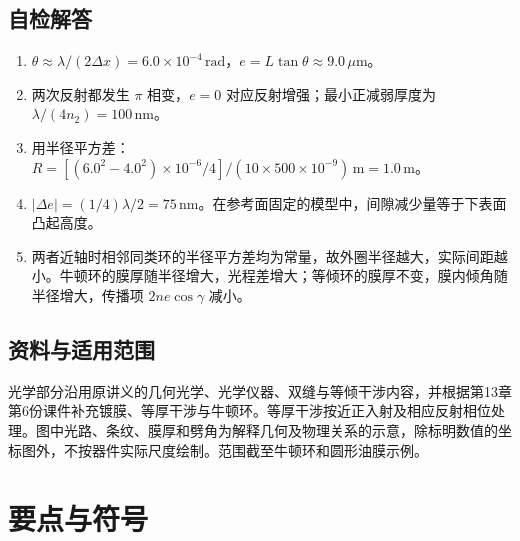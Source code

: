 \documentclass[UTF8,fontset=none,zihao=-4,a4paper]{ctexart}
\newcommand{\chapterpage}[1]{\clearpage\section{#1}}
\newcommand{\unit}[1]{\,\mathrm{#1}}
\begin{document}
\subsection{自检解答}
\begin{enumerate}
\item $\theta\approx\lambda/(2\Delta x)=6.0\times10^{-4}\unit{rad}$，$e=L\tan\theta\approx9.0\,\mu\mathrm m$。
\item 两次反射都发生 $\pi$ 相变，$e=0$ 对应反射增强；最小正减弱厚度为 $\lambda/(4n_2)=100\unit{nm}$。
\item 用半径平方差：$R=[(6.0^2-4.0^2)\times10^{-6}/4]/(10\times500\times10^{-9})\unit m=1.0\unit m$。
\item $|\Delta e|=(1/4)\lambda/2=75\unit{nm}$。在参考面固定的模型中，间隙减少量等于下表面凸起高度。
\item 两者近轴时相邻同类环的半径平方差均为常量，故外圈半径越大，实际间距越小。牛顿环的膜厚随半径增大，光程差增大；等倾环的膜厚不变，膜内倾角随半径增大，传播项 $2ne\cos\gamma$ 减小。
\end{enumerate}

\subsection{资料与适用范围}
光学部分沿用原讲义的几何光学、光学仪器、双缝与等倾干涉内容，并根据第13章第6份课件补充镀膜、等厚干涉与牛顿环。等厚干涉按近正入射及相应反射相位处理。图中光路、条纹、膜厚和劈角为解释几何及物理关系的示意，除标明数值的坐标图外，不按器件实际尺度绘制。范围截至牛顿环和圆形油膜示例。


\clearpage\endgroup
\chapterpage{要点与符号}
\end{document}
